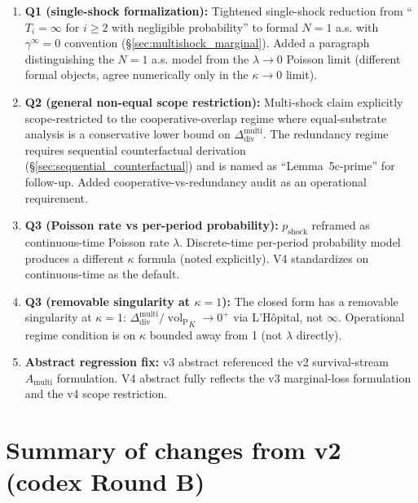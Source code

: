 \documentclass{article}
\DeclareMathOperator{\vol}{vol}
\newcommand{\volL}{{\vol_{\mathrm{P}}}}
\newcommand{\Ddiv}{\Delta_{\mathrm{div}}}
\newcommand{\pshock}{p_{\mathrm{shock}}}
\begin{document}
\begin{enumerate}
\item \textbf{Q1 (single-shock formalization):} Tightened single-shock
  reduction from ``$T_i = \infty$ for $i \geq 2$ with negligible
  probability'' to formal $N = 1$ a.s. with $\gamma^{\infty} = 0$
  convention (\S\ref{sec:multishock_marginal}).  Added a paragraph
  distinguishing the $N=1$ a.s. model from the $\lambda \to 0$
  Poisson limit (different formal objects, agree numerically only
  in the $\kappa \to 0$ limit).

\item \textbf{Q2 (general non-equal scope restriction):}
  Multi-shock claim explicitly scope-restricted to the
  cooperative-overlap regime where equal-substrate analysis is a
  conservative lower bound on $\Ddiv^{\mathrm{multi}}$.  The
  redundancy regime requires sequential counterfactual derivation
  (\S\ref{sec:sequential_counterfactual}) and is named as
  ``Lemma~5c-prime'' for follow-up.  Added cooperative-vs-redundancy
  audit as an operational requirement.

\item \textbf{Q3 (Poisson rate vs per-period probability):} $\pshock$
  reframed as continuous-time Poisson rate $\lambda$.  Discrete-time
  per-period probability model produces a different $\kappa$ formula
  (noted explicitly).  V4 standardizes on continuous-time as the
  default.

\item \textbf{Q3 (removable singularity at $\kappa = 1$):}  The
  closed form has a removable singularity at $\kappa = 1$:
  $\Ddiv^{\mathrm{multi}}/\volL_K \to 0^+$ via L'H\^opital, not
  $\infty$.  Operational regime condition is on $\kappa$ bounded
  away from 1 (not $\lambda$ directly).

\item \textbf{Abstract regression fix:}  v3 abstract referenced the
  v2 survival-stream $A_{\mathrm{multi}}$ formulation.  V4 abstract
  fully reflects the v3 marginal-loss formulation and the v4 scope
  restriction.
\end{enumerate}

\section{Summary of changes from v2 (codex Round B)}
\end{document}
